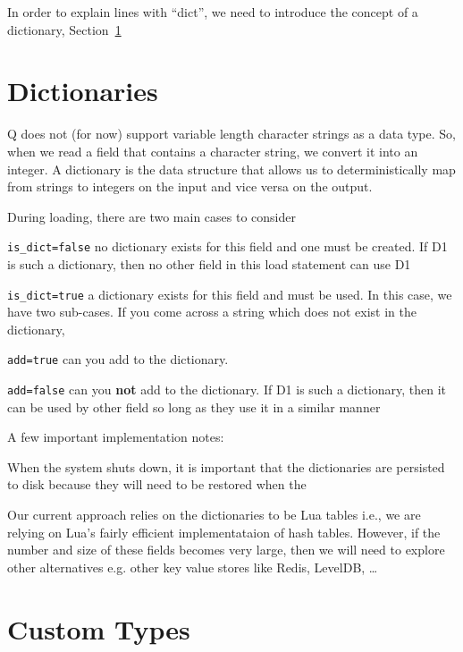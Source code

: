 \documentclass[letterpaper]{article}
\begin{document}
\item 
In order to explain lines with ``dict'', we need to introduce the concept of
a dictionary, Section~\ref{dictionary}
\ee

\section{Dictionaries}
\label{dictionary}

Q does not (for now) support variable length character strings as a
data type.  So, when we read a field that contains a character string,
we convert it into an integer. A dictionary is the data structure that allows us
to deterministically map from strings to integers on the input and vice versa on
the output.

During loading, there are two main cases to consider
\be
\item \verb+is_dict=false+ no dictionary exists for this field and one must be created. If D1 is such
  a dictionary, then no other field in this load statement can use D1
\item \verb+is_dict=true+ a dictionary exists for this field and must be used. In this case, we have
  two sub-cases.  If you come across a string which does not exist in the dictionary, 
  \be
\item \verb+add=true+ can you add to the dictionary. 
\item \verb+add=false+ can you {\bf not} add to the dictionary. 
  \ee
  If D1 is such a dictionary, then it can be used by other field so long as they use it in a similar manner
  \ee

A few important implementation notes:
\be
\item 
When the system shuts down, it is important that the dictionaries are persisted
to disk because they will need to be restored when the 
\item Our current approach relies on the dictionaries to be Lua tables i.e., we
  are relying on Lua's fairly efficient implementataion of hash tables. However,
  if the number and size of these fields becomes very large, then we will need
  to explore other alternatives e.g. other key value stores like Redis, LevelDB,
  \ldots
  \ee

\section{Custom Types}
\label{custom_types}
\end{document}
